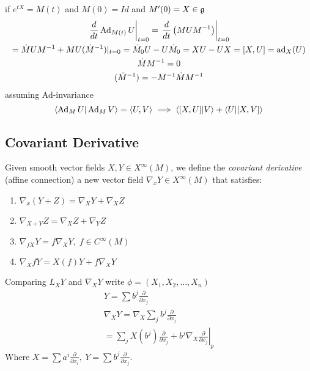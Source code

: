 if $e^{tX} = M(t)$ and $M(0)=Id$ and $M'(0)=X\in \mathfrak{g}$
\begin{gather*}
    \left.\frac{d}{dt} \operatorname{Ad}_{M(t)} U \right|_{t=0} =     \left.\frac{d}{dt}\left( MUM^{-1} \right) \right|_{t=0}\\
    = \dot M U M^{-1} + M U (\dot M^{-1})|_{t=0} = \dot M_0 U - U\dot M_0 = XU-UX= [X,U] = \operatorname{ad}_X(U)\\
    \dot M M^{-1} = 0 \\
    (\dot M ^{-1}) = - M^{-1}\dot M M^{-1}
\end{gather*}
assuming Ad-invariance
$$ \langle \operatorname{Ad}_M U | \operatorname{Ad}_M V \rangle = \langle U, V \rangle \implies \langle [X,U] | V \rangle + \langle U|[X,V] \rangle$$

\subsection{Covariant Derivative}
\begin{ddef}
    Given smooth vector fields $X,Y\in X^\infty(M)$, we define the \emph{covariant derivative} (affine connection) a new vector field $\nabla_xY \in X^\infty(M) $ that satisfies:
    \begin{enumerate}
        \item $\nabla_x(Y+Z) = \nabla_X Y + \nabla_XZ$
        \item $\nabla_{X+Y} Z = \nabla_X Z + \nabla_Y Z $
        \item $\nabla_{fX}Y = f\nabla_XY,\; f\in C^\infty(M)$
        \item $\nabla_X fY = X(f) Y + f\nabla_XY$
    \end{enumerate}
\end{ddef}
    Comparing $L_XY $ and  $\nabla_XY$ write $\phi= (X_1,X_2,\ldots, X_n)$ 
    \begin{gather*}
        Y=  \sum b^j \frac{\partial}{\partial x_j} \\
        \nabla_XY = \nabla_X \sum_j b^j \frac{\partial}{\partial x_j}\\
        = \sum_j X(b^j) \frac{\partial}{\partial x_j} + b^j\nabla_X \left.  \frac{\partial}{\partial x_j} \right|_p
    \end{gather*}
    Where $X= \sum a^i  \frac{\partial}{\partial x_i}, \ Y = \sum b^j \frac{\partial}{\partial x_j}$.

